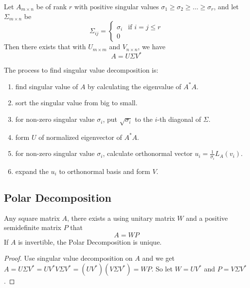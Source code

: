 \begin{theorem}
    Let $A_{m \times n}$ be of rank $r$ with positive singular values $\sigma_1 \geq \sigma_2 \geq \dots \geq \sigma_r$, and let $\Sigma_{m \times n}$ be
    \begin{equation}
        \Sigma_{ij} = \begin{cases}
            \sigma_i & \text{if } i = j \leq r \\
            0
        \end{cases}
    \end{equation}
    Then there exists  that with $U_{m \times m}$ and $V_{n \times n}$, we have
    \begin{equation}
        A = U \Sigma V^*
    \end{equation}
    
    The process to find singular value decomposition is:
    \begin{enumerate}
        \item find singular value of $A$ by calculating the eigenvalue of $A^*A$.
        \item sort the singular value from big to small.
        \item for non-zero singular value $\sigma_i$, put $\sqrt{\sigma_i}$ to the $i$-th diagonal of $\Sigma$.
        \item form $U$ of normalized eigenvector of $A^*A$.
        \item for non-zero singular value $\sigma_i$, calculate orthonormal vector $\displaystyle u_i = \frac{1}{\sigma_i} L_A(v_i)$.
        \item expand the $u_i$ to orthonormal basis and form $V$.
    \end{enumerate}
\end{theorem}



\subsection{Polar Decomposition}

\begin{theorem}
    Any square matrix $A$, there exists a  using unitary matrix $W$ and a positive semidefinite matrix $P$ that 
    \begin{equation}
        A = WP
    \end{equation}
    If $A$ is invertible, the Polar Decomposition is unique.
\end{theorem}
\begin{proof}
    Use singular value decomposition on $A$ and we get $A = U \Sigma V^* = U V^* V \Sigma V^* = ( U V^*) ( V \Sigma V^*) =  WP$.
    So let $W = U V^*$ and $P = V \Sigma V^*$.
\end{proof}



